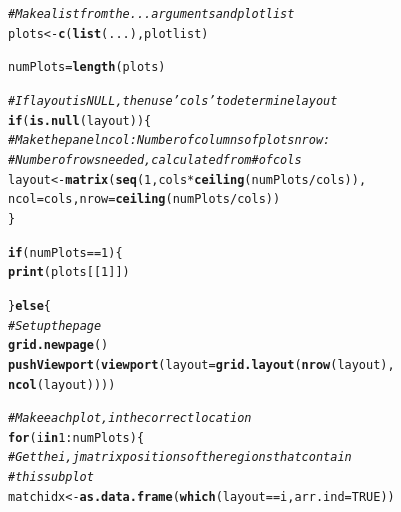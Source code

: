 \documentclass[11pt,letter]{article}\usepackage[]{graphicx}\usepackage[]{color}
\makeatletter
\newcommand{\hlnum}[1]{\textcolor[rgb]{0.686,0.059,0.569}{#1}}%
\newcommand{\hlcom}[1]{\textcolor[rgb]{0.678,0.584,0.686}{\textit{#1}}}%
\newcommand{\hlopt}[1]{\textcolor[rgb]{0,0,0}{#1}}%
\newcommand{\hlstd}[1]{\textcolor[rgb]{0.345,0.345,0.345}{#1}}%
\newcommand{\hlkwa}[1]{\textcolor[rgb]{0.161,0.373,0.58}{\textbf{#1}}}%
\newcommand{\hlkwb}[1]{\textcolor[rgb]{0.69,0.353,0.396}{#1}}%
\newcommand{\hlkwc}[1]{\textcolor[rgb]{0.333,0.667,0.333}{#1}}%
\newcommand{\hlkwd}[1]{\textcolor[rgb]{0.737,0.353,0.396}{\textbf{#1}}}%
\newenvironment{kframe}{%
 \def\at@end@of@kframe{}%
 \ifinner\ifhmode%
  \def\at@end@of@kframe{\end{minipage}}%
  \begin{minipage}{\columnwidth}%
 \fi\fi%
 \def\FrameCommand##1{\hskip\@totalleftmargin \hskip-\fboxsep
 \colorbox{shadecolor}{##1}\hskip-\fboxsep
     \hskip-\linewidth \hskip-\@totalleftmargin \hskip\columnwidth}%
 \MakeFramed {\advance\hsize-\width
   \@totalleftmargin\z@ \linewidth\hsize
   \@setminipage}}%
 {\par\unskip\endMakeFramed%
 \at@end@of@kframe}
\newenvironment{knitrout}{}{} %
\makeatother
\begin{document}
\begin{knitrout}
\begin{kframe}
\begin{alltt}
    \hlcom{# Make a list from the ... arguments and plotlist}
    \hlstd{plots} \hlkwb{<-} \hlkwd{c}\hlstd{(}\hlkwd{list}\hlstd{(...), plotlist)}

    \hlstd{numPlots} \hlkwb{=} \hlkwd{length}\hlstd{(plots)}

    \hlcom{# If layout is NULL, then use 'cols' to determine layout}
    \hlkwa{if} \hlstd{(}\hlkwd{is.null}\hlstd{(layout)) \{}
        \hlcom{# Make the panel ncol: Number of columns of plots nrow:}
        \hlcom{# Number of rows needed, calculated from # of cols}
        \hlstd{layout} \hlkwb{<-} \hlkwd{matrix}\hlstd{(}\hlkwd{seq}\hlstd{(}\hlnum{1}\hlstd{, cols} \hlopt{*} \hlkwd{ceiling}\hlstd{(numPlots}\hlopt{/}\hlstd{cols)),}
            \hlkwc{ncol} \hlstd{= cols,} \hlkwc{nrow} \hlstd{=} \hlkwd{ceiling}\hlstd{(numPlots}\hlopt{/}\hlstd{cols))}
    \hlstd{\}}

    \hlkwa{if} \hlstd{(numPlots} \hlopt{==} \hlnum{1}\hlstd{) \{}
        \hlkwd{print}\hlstd{(plots[[}\hlnum{1}\hlstd{]])}

    \hlstd{\}} \hlkwa{else} \hlstd{\{}
        \hlcom{# Set up the page}
        \hlkwd{grid.newpage}\hlstd{()}
        \hlkwd{pushViewport}\hlstd{(}\hlkwd{viewport}\hlstd{(}\hlkwc{layout} \hlstd{=} \hlkwd{grid.layout}\hlstd{(}\hlkwd{nrow}\hlstd{(layout),}
            \hlkwd{ncol}\hlstd{(layout))))}

        \hlcom{# Make each plot, in the correct location}
        \hlkwa{for} \hlstd{(i} \hlkwa{in} \hlnum{1}\hlopt{:}\hlstd{numPlots) \{}
            \hlcom{# Get the i,j matrix positions of the regions that contain}
            \hlcom{# this subplot}
            \hlstd{matchidx} \hlkwb{<-} \hlkwd{as.data.frame}\hlstd{(}\hlkwd{which}\hlstd{(layout} \hlopt{==} \hlstd{i,} \hlkwc{arr.ind} \hlstd{=} \hlnum{TRUE}\hlstd{))}


\end{alltt}
\end{kframe}
\end{knitrout}
\end{document}
